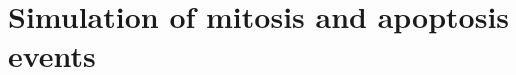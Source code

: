 \documentclass[
reprint
,aps
,amssymb
,amsmath
,superscriptaddress
]{revtex4-1}
\newcommand{\mdc}[1]{{\color{blue}#1}}
\begin{document}




\section{Simulation of mitosis and apoptosis events \label{sec:dd}}
\end{document}
